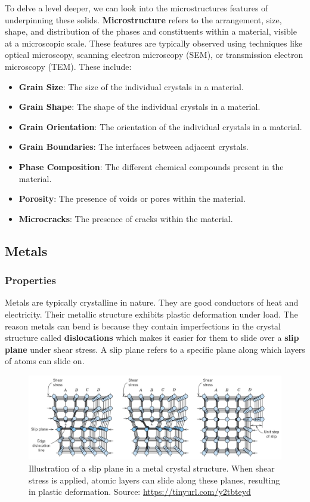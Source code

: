 \documentclass[12pt]{article}
\begin{document}
To delve a level deeper, we can look into the microstructures features of
underpinning these solids. \textbf{Microstructure} refers to the arrangement,
size, shape, and distribution of the phases and constituents within a material,
visible at a microscopic scale. These features are typically observed using
techniques like optical microscopy, scanning electron microscopy (SEM), or
transmission electron microscopy (TEM). These include:
\begin{itemize}
    \item \textbf{Grain Size}: The size of the individual crystals in a material.
    \item \textbf{Grain Shape}: The shape of the individual crystals in a material.
    \item \textbf{Grain Orientation}: The orientation of the individual crystals in a material.
    \item \textbf{Grain Boundaries}: The interfaces between adjacent crystals.
    \item \textbf{Phase Composition}: The different chemical compounds present in the material.
    \item \textbf{Porosity}: The presence of voids or pores within the material.
    \item \textbf{Microcracks}: The presence of cracks within the material.
\end{itemize}

\subsection{Metals}
\subsubsection{Properties}
Metals are typically crystalline in nature. They are good conductors of heat
and electricity. Their metallic structure exhibits plastic deformation under
load. The reason metals can bend is because they contain imperfections in the
crystal structure called \textbf{dislocations} which makes it easier for them
to slide over a \textbf{slip plane} under shear stress. A slip plane refers to
a specific plane along which layers of atoms can slide on.

\begin{figure}[htbp]
    \centering
    \includegraphics[width=1\textwidth]{figures/chapter_2/slip_plane.png}
    \caption{Illustration of a slip plane in a metal crystal structure. When shear stress is applied, atomic layers can slide along these planes, resulting in plastic deformation. Source: \url{https://tinyurl.com/y2tbteyd}}\label{fig:slip_plane}
\end{figure}
\end{document}
